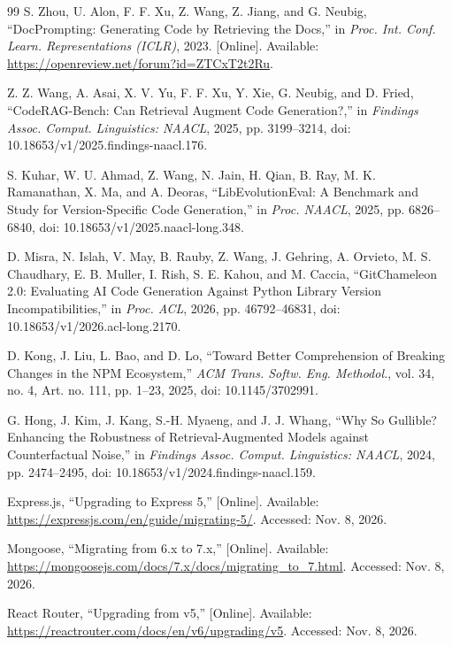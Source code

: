 \documentclass[conference]{IEEEtran}
\begin{document}
\balance
\begin{thebibliography}{99}
S. Zhou, U. Alon, F. F. Xu, Z. Wang, Z. Jiang, and G. Neubig, ``DocPrompting: Generating Code by Retrieving the Docs,'' in \emph{Proc. Int. Conf. Learn. Representations (ICLR)}, 2023. [Online]. Available: \url{https://openreview.net/forum?id=ZTCxT2t2Ru}.

Z. Z. Wang, A. Asai, X. V. Yu, F. F. Xu, Y. Xie, G. Neubig, and D. Fried, ``CodeRAG-Bench: Can Retrieval Augment Code Generation?,'' in \emph{Findings Assoc. Comput. Linguistics: NAACL}, 2025, pp. 3199--3214, doi: 10.18653/v1/2025.findings-naacl.176.

S. Kuhar, W. U. Ahmad, Z. Wang, N. Jain, H. Qian, B. Ray, M. K. Ramanathan, X. Ma, and A. Deoras, ``LibEvolutionEval: A Benchmark and Study for Version-Specific Code Generation,'' in \emph{Proc. NAACL}, 2025, pp. 6826--6840, doi: 10.18653/v1/2025.naacl-long.348.

D. Misra, N. Islah, V. May, B. Rauby, Z. Wang, J. Gehring, A. Orvieto, M. S. Chaudhary, E. B. Muller, I. Rish, S. E. Kahou, and M. Caccia, ``GitChameleon 2.0: Evaluating AI Code Generation Against Python Library Version Incompatibilities,'' in \emph{Proc. ACL}, 2026, pp. 46792--46831, doi: 10.18653/v1/2026.acl-long.2170.

D. Kong, J. Liu, L. Bao, and D. Lo, ``Toward Better Comprehension of Breaking Changes in the NPM Ecosystem,'' \emph{ACM Trans. Softw. Eng. Methodol.}, vol. 34, no. 4, Art. no. 111, pp. 1--23, 2025, doi: 10.1145/3702991.

G. Hong, J. Kim, J. Kang, S.-H. Myaeng, and J. J. Whang, ``Why So Gullible? Enhancing the Robustness of Retrieval-Augmented Models against Counterfactual Noise,'' in \emph{Findings Assoc. Comput. Linguistics: NAACL}, 2024, pp. 2474--2495, doi: 10.18653/v1/2024.findings-naacl.159.

Express.js, ``Upgrading to Express 5,'' [Online]. Available: \url{https://expressjs.com/en/guide/migrating-5/}. Accessed: Nov. 8, 2026.

Mongoose, ``Migrating from 6.x to 7.x,'' [Online]. Available: \url{https://mongoosejs.com/docs/7.x/docs/migrating_to_7.html}. Accessed: Nov. 8, 2026.

React Router, ``Upgrading from v5,'' [Online]. Available: \url{https://reactrouter.com/docs/en/v6/upgrading/v5}. Accessed: Nov. 8, 2026.

\end{thebibliography}
\end{document}
